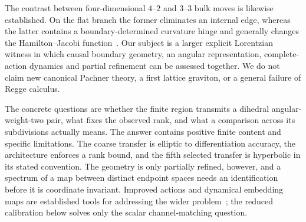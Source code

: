 \documentclass[11pt]{article}
\theoremstyle{remark}\newtheorem{remark}[theorem]{Remark}
\begin{document}
The contrast between four-dimensional $4$--$2$ and $3$--$3$ bulk moves is likewise established.
On the flat branch the former eliminates an internal edge, whereas the latter contains a boundary-determined curvature hinge and generally changes the Hamilton--Jacobi function~\cite{BorissovaDittrich2023}.
Our subject is a larger explicit Lorentzian witness in which causal boundary geometry, an angular representation, complete-action dynamics and partial refinement can be assessed together.
We do not claim new canonical Pachner theory, a first lattice graviton, or a general failure of Regge calculus.

The concrete questions are whether the finite region transmits a dihedral angular-weight-two pair, what fixes the observed rank, and what a comparison across its subdivisions actually means.
The answer contains positive finite content and specific limitations.
The coarse transfer is elliptic to differentiation accuracy, the architecture enforces a rank bound, and the fifth selected transfer is hyperbolic in its stated convention.
The geometry is only partially refined, however, and a spectrum of a map between distinct endpoint spaces needs an identification before it is coordinate invariant.
Improved actions and dynamical embedding maps are established tools for addressing the wider problem~\cite{BahrDittrich2009,Dittrich2012}; the reduced calibration below solves only the scalar channel-matching question.
\end{document}
